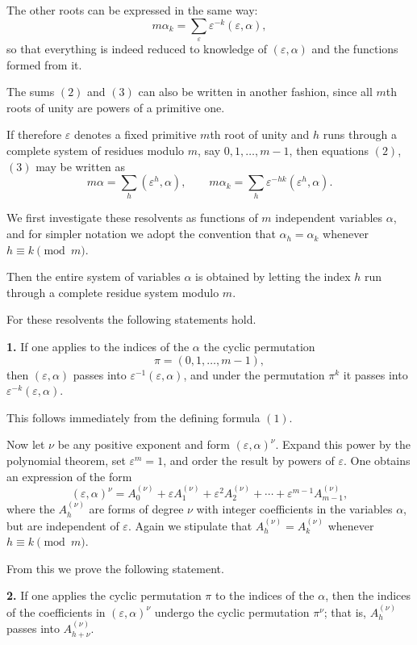 \documentclass[11pt]{article}
\begin{document}
The other roots can be expressed in the same way:
\[
m\alpha_k=\sum_{\varepsilon}\varepsilon^{-k}(\varepsilon,\alpha),
\tag{4}
\]
so that everything is indeed reduced to knowledge of $(\varepsilon,\alpha)$ and the functions formed from it.

The sums \((2)\) and \((3)\) can also be written in another fashion, since all $m$th roots of unity are powers of a primitive one.

If therefore $\varepsilon$ denotes a fixed primitive $m$th root of unity and $h$ runs through a complete system of residues modulo $m$, say $0,1,\dots,m-1$, then equations \((2)\), \((3)\) may be written as
\[
m\alpha=\sum_h (\varepsilon^h,\alpha),\qquad
m\alpha_k=\sum_h \varepsilon^{-hk}(\varepsilon^h,\alpha).
\tag{5}
\]

We first investigate these resolvents as functions of $m$ independent variables $\alpha$, and for simpler notation we adopt the convention that $\alpha_h=\alpha_k$ whenever $h\equiv k\pmod m$.

Then the entire system of variables $\alpha$ is obtained by letting the index $h$ run through a complete residue system modulo $m$.

For these resolvents the following statements hold.

\medskip
\noindent\textbf{1.}
If one applies to the indices of the $\alpha$ the cyclic permutation
\[
\pi=(0,1,\dots,m-1),
\]
then $(\varepsilon,\alpha)$ passes into $\varepsilon^{-1}(\varepsilon,\alpha)$, and under the permutation $\pi^k$ it passes into $\varepsilon^{-k}(\varepsilon,\alpha)$.

\medskip
This follows immediately from the defining formula \((1)\).

Now let $\nu$ be any positive exponent and form $(\varepsilon,\alpha)^\nu$. Expand this power by the polynomial theorem, set $\varepsilon^m=1$, and order the result by powers of $\varepsilon$. One obtains an expression of the form
\[
(\varepsilon,\alpha)^\nu
=
A^{(\nu)}_0+\varepsilon A^{(\nu)}_1+\varepsilon^2A^{(\nu)}_2+\cdots+\varepsilon^{m-1}A^{(\nu)}_{m-1},
\tag{5'}
\]
where the $A^{(\nu)}_h$ are forms of degree $\nu$ with integer coefficients in the variables $\alpha$, but are independent of $\varepsilon$.
Again we stipulate that $A^{(\nu)}_h=A^{(\nu)}_k$ whenever $h\equiv k\pmod m$.

From this we prove the following statement.

\medskip
\noindent\textbf{2.}
If one applies the cyclic permutation $\pi$ to the indices of the $\alpha$, then the indices of the coefficients in $(\varepsilon,\alpha)^\nu$ undergo the cyclic permutation $\pi^\nu$; that is, $A^{(\nu)}_h$ passes into $A^{(\nu)}_{h+\nu}$.
\end{document}
